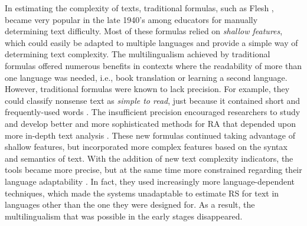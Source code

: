 \documentclass{bsu-ms}
\begin{document}
In estimating the complexity of texts, traditional formulas, such as Flesh \cite{flesch1948new}, became very popular in the late 1940's among educators for manually determining text difficulty. Most of these formulas relied on \textit{shallow features}, which could easily be adapted to multiple languages and provide a simple way of determining text complexity. The multilingualism achieved by traditional formulas offered numerous benefits in contexts where the readability of more than one language was needed, i.e., book translation or learning a second language. However, traditional formulas were known to lack precision. For example, they could classify nonsense text as \textit{simple to read}, just because it contained short and frequently-used words \cite{davison1982failure}. The insufficient precision encouraged researchers to study and develop better and more sophisticated methods for RA that depended upon more in-depth text analysis \cite{franccois2012ai,aluisio2010readability}. These new formulas continued taking advantage of  shallow  features, but incorporated more complex features based on the syntax and semantics of text. With the addition of new text complexity indicators, the tools became more precise, but at the same time more constrained regarding their language adaptability \cite{benjamin2012reconstructing,feng2010comparison}. In fact, they used increasingly more language-dependent techniques, which made the systems unadaptable to estimate RS for text in languages other than the one they were designed for. As a result, the multilingualism that was possible in the early stages disappeared.  
\end{document}
